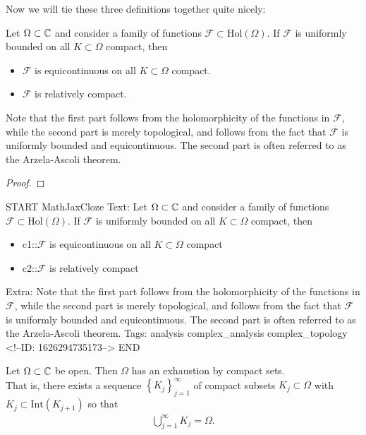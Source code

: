 \documentclass{memoir}
\begin{document}
Now we will tie these three definitions together quite nicely:

\begin{thm}
	Let \(\Omega \subset \mathbb{C}\) and consider a family of functions \(\mathcal{F}\subset \textrm{Hol}(\Omega )\). If \(\mathcal{F}\) is uniformly bounded on all \(K\subset \Omega \) compact, then
	\begin{itemize}
		\item \(\mathcal{F}\) is equicontinuous on all \(K\subset \Omega \) compact.
		\item \(\mathcal{F}\) is relatively compact.
	\end{itemize}
\end{thm}
Note that the first part follows from the holomorphicity of the functions in \(\mathcal{F}\), while the second part is merely topological, and follows from the fact that \(\mathcal{F}\) is uniformly bounded and equicontinuous. The second part is often referred to as the Arzela-Ascoli theorem.

\begin{proof}%
	
\end{proof}

\begin{anki}
START
MathJaxCloze
Text: Let \(\Omega \subset \mathbb{C}\) and consider a family of functions \(\mathcal{F}\subset \textrm{Hol}(\Omega )\). If \(\mathcal{F}\) is uniformly bounded on all \(K\subset \Omega \) compact, then
	\begin{itemize}
		\item {{c1::\(\mathcal{F}\) is equicontinuous on all \(K\subset \Omega \) compact}}
		\item {{c2::\(\mathcal{F}\) is relatively compact}}
	\end{itemize}
Extra: Note that the first part follows from the holomorphicity of the functions in \(\mathcal{F}\), while the second part is merely topological, and follows from the fact that \(\mathcal{F}\) is uniformly bounded and equicontinuous. The second part is often referred to as the Arzela-Ascoli theorem.
Tags: analysis complex_analysis complex_topology
<!--ID: 1626294735173-->
END
\end{anki}


\begin{lemma}
	Let \(\Omega \subset \mathbb{C}\) be open. Then \(\Omega \) has an exhaustion by compact sets.\\

	That is, there exists a sequence \(\left\{ K_j \right\}_{j=1}^{\infty}\) of compact subsets \(K_j \subset \Omega \) with \(K_j \subset \textrm{Int}(K_{j+1})\) so that
	\begin{align*}
		\bigcup_{j=1}^{\infty}K_j = \Omega .
	\end{align*}
\end{lemma}
\end{document}
